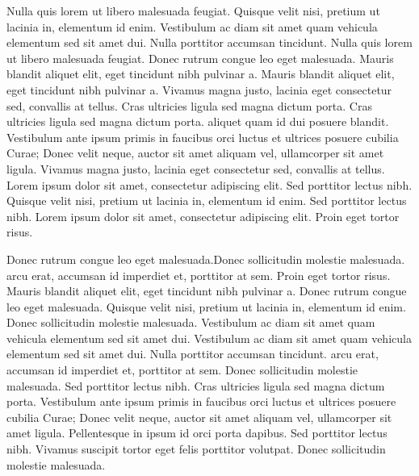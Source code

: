 \documentclass{article}
\begin{document}
Nulla quis lorem ut libero malesuada feugiat. Quisque velit nisi, pretium ut lacinia in, elementum id enim. Vestibulum ac diam sit amet quam vehicula elementum sed sit amet dui. Nulla porttitor accumsan tincidunt. Nulla quis lorem ut libero malesuada feugiat. Donec rutrum congue leo eget malesuada. Mauris blandit aliquet elit, eget tincidunt nibh pulvinar a. Mauris blandit aliquet elit, eget tincidunt nibh pulvinar a. Vivamus magna justo, lacinia eget consectetur sed, convallis at tellus. Cras ultricies ligula sed magna dictum porta. Cras ultricies ligula sed magna dictum porta.  aliquet quam id dui posuere blandit. Vestibulum ante ipsum primis in faucibus orci luctus et ultrices posuere cubilia Curae; Donec velit neque, auctor sit amet aliquam vel, ullamcorper sit amet ligula. Vivamus magna justo, lacinia eget consectetur sed, convallis at tellus. Lorem ipsum dolor sit amet, consectetur adipiscing elit. Sed porttitor lectus nibh. Quisque velit nisi, pretium ut lacinia in, elementum id enim. Sed porttitor lectus nibh. Lorem ipsum dolor sit amet, consectetur adipiscing elit. Proin eget tortor risus.

Donec rutrum congue leo eget malesuada.Donec sollicitudin molestie malesuada.  arcu erat, accumsan id imperdiet et, porttitor at sem. Proin eget tortor risus. Mauris blandit aliquet elit, eget tincidunt nibh pulvinar a. Donec rutrum congue leo eget malesuada. Quisque velit nisi, pretium ut lacinia in, elementum id enim. Donec sollicitudin molestie malesuada. Vestibulum ac diam sit amet quam vehicula elementum sed sit amet dui. Vestibulum ac diam sit amet quam vehicula elementum sed sit amet dui. Nulla porttitor accumsan tincidunt.  arcu erat, accumsan id imperdiet et, porttitor at sem. Donec sollicitudin molestie malesuada. Sed porttitor lectus nibh. Cras ultricies ligula sed magna dictum porta. Vestibulum ante ipsum primis in faucibus orci luctus et ultrices posuere cubilia Curae; Donec velit neque, auctor sit amet aliquam vel, ullamcorper sit amet ligula. Pellentesque in ipsum id orci porta dapibus. Sed porttitor lectus nibh. Vivamus suscipit tortor eget felis porttitor volutpat. Donec sollicitudin molestie malesuada.
\end{document}
